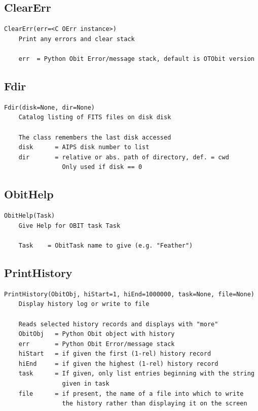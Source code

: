\documentclass[11pt]{report}
\begin{document}
\subsection{ClearErr}
\begin{verbatim}
ClearErr(err=<C OErr instance>)
    Print any errors and clear stack
    
    err  = Python Obit Error/message stack, default is OTObit version
\end{verbatim}

\subsection{Fdir}
\begin{verbatim}
Fdir(disk=None, dir=None)
    Catalog listing of FITS files on disk disk
    
    The class remembers the last disk accessed
    disk      = AIPS disk number to list
    dir       = relative or abs. path of directory, def. = cwd
                Only used if disk == 0
\end{verbatim}

\subsection{ObitHelp}
\begin{verbatim}
ObitHelp(Task)
    Give Help for OBIT task Task
    
    Task    = ObitTask name to give (e.g. "Feather")
\end{verbatim}

\subsection{PrintHistory}
\begin{verbatim}
PrintHistory(ObitObj, hiStart=1, hiEnd=1000000, task=None, file=None)
    Display history log or write to file
    
    Reads selected history records and displays with "more"
    ObitObj   = Python Obit object with history
    err       = Python Obit Error/message stack
    hiStart   = if given the first (1-rel) history record
    hiEnd     = if given the highest (1-rel) history record
    task      = If given, only list entries beginning with the string
                given in task
    file      = if present, the name of a file into which to write
                the history rather than displaying it on the screen
\end{verbatim}
\end{document}
